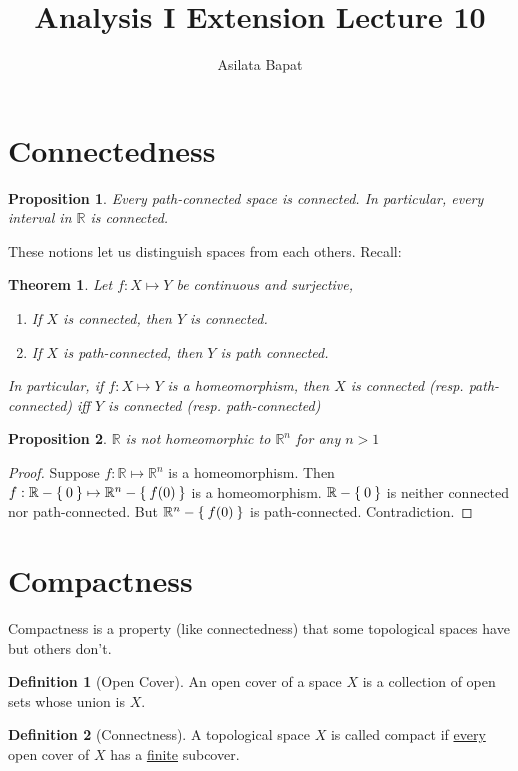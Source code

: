 \documentclass[12pt]{amsart}
\title{Analysis I Extension Lecture 10}
\author{Asilata Bapat}
\newcommand{\bbR}{\mathbb{R}}
\theoremstyle{plain}
\newtheorem*{prop}{Proposition}
\newtheorem*{thm}{Theorem}
\theoremstyle{remark}
\theoremstyle{definition}
\newtheorem*{define}{Definition}
\begin{document}
\maketitle

\section*{Connectedness}
\begin{prop}
	Every path-connected space is connected. In particular, every interval in $\bbR$ is connected.
\end{prop}

These notions let us distinguish spaces from each others. Recall:

\begin{thm}
	Let $f:X\mapsto Y$ be continuous and surjective, 
\begin{enumerate}[(1)]
\item If $X$ is connected, then $Y$ is connected.
\item If $X$ is path-connected, then $Y$ is path connected. 
\end{enumerate}

In particular, if $f:X\mapsto Y$ is a homeomorphism, then $X$ is connected (resp. path-connected) iff $Y$ is connected (resp. path-connected)
\end{thm}

\begin{prop}
$\bbR$ is not homeomorphic to $\bbR^n$ for any $n > 1$
\end{prop}

\begin{proof}
Suppose $f:\bbR\mapsto \bbR^n$ is a homeomorphism. Then $f:\bbR - \Set{0} \mapsto \bbR^n - \Set{f(0)}$ is a homeomorphism.
$\bbR - \Set{0}$ is neither connected nor path-connected. But $\bbR^n - \Set{f(0)}$ is path-connected. Contradiction. 
\end{proof}

\section*{Compactness}
Compactness is a property (like connectedness) that some topological spaces have but others don't.
\begin{define}[Open Cover]
An open cover of a space $X$ is a collection of open sets whose union is $X$.
\end{define}

\begin{define}[Connectness]
A topological space $X$ is called compact if \underline{every} open cover of $X$ has a \underline{finite} subcover.
\end{define}
\end{document}
